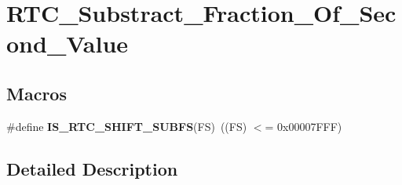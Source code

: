 \hypertarget{group___r_t_c___substract___fraction___of___second___value}{}\section{R\+T\+C\+\_\+\+Substract\+\_\+\+Fraction\+\_\+\+Of\+\_\+\+Second\+\_\+\+Value}
\label{group___r_t_c___substract___fraction___of___second___value}
\subsection*{Macros}
\begin{DoxyCompactItemize}
\item 
\hypertarget{group___r_t_c___substract___fraction___of___second___value_ga8ad118d512f7dc9ce3d4b6669fd3f4b4}{}\#define {\bfseries I\+S\+\_\+\+R\+T\+C\+\_\+\+S\+H\+I\+F\+T\+\_\+\+S\+U\+B\+F\+S}(F\+S)~((F\+S) $<$= 0x00007\+F\+F\+F)\label{group___r_t_c___substract___fraction___of___second___value_ga8ad118d512f7dc9ce3d4b6669fd3f4b4}

\end{DoxyCompactItemize}


\subsection{Detailed Description}
